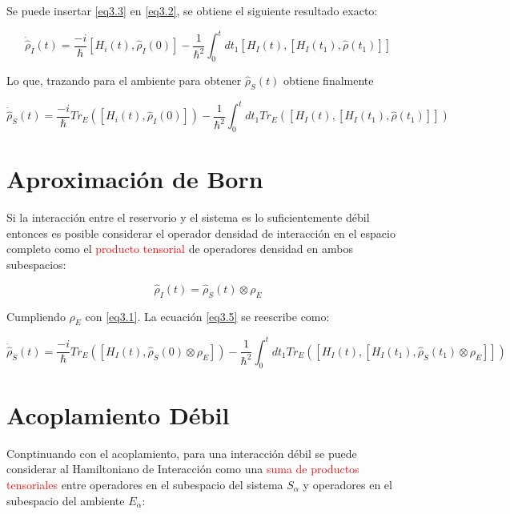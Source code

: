 \documentclass{book}
\begin{document}
Se puede insertar \ref{eq3.3} en \ref{eq3.2}, se obtiene el siguiente resultado exacto:

\begin{equation}\label{eq3.4}\dot{\hat{\rho}}_I(t)=\frac{-i}{\hslash}[H_i(t),\hat{\rho}_I(0)]-\frac{1}{\hslash^2}\int_0^t dt_1 [H_I(t),[H_I(t_1),\hat{\rho}(t_1)]]\end{equation}

Lo que, trazando para el ambiente para obtener $\hat{\rho}_S(t)$ obtiene finalmente

\begin{equation}\label{eq3.5}\dot{\hat{\rho}}_S(t)=\frac{-i}{\hslash}Tr_E([H_i(t),\hat{\rho}_I(0)])-\frac{1}{\hslash^2}\int_0^t dt_1 Tr_E([H_I(t),[H_I(t_1),\hat{\rho}(t_1)]])\end{equation}

\section{Aproximación de Born}

Si la interacción entre el reservorio y el sistema es lo suficientemente débil entonces es posible considerar el operador densidad de interacción en el espacio completo como el \textcolor{red}{producto tensorial} de operadores densidad en ambos subespacios:

\begin{equation}\label{eq3.6}\hat{\rho}_I(t)=\hat{\rho}_S(t)\otimes\rho_E\end{equation}

Cumpliendo $\rho_E$ con \ref{eq3.1}. La ecuación \ref{eq3.5} se reescribe como:

\begin{equation}\label{eq3.7}\dot{\hat{\rho}}_S(t)=\frac{-i}{\hslash}Tr_E([H_I(t),\hat{\rho}_S(0)\otimes\rho_E])-\frac{1}{\hslash^2}\int_0^t dt_1 Tr_E([H_I(t),[H_I(t_1),\hat{\rho}_S(t_1)\otimes\rho_E]])\end{equation}

\section{Acoplamiento Débil}

Conptinuando con el acoplamiento, para una interacción débil se puede considerar al Hamiltoniano de Interacción como una \textcolor{red}{suma de productos tensoriales} entre operadores en el subespacio del sistema $S_\alpha$ y operadores en el subespacio del ambiente $E_\alpha$:
\end{document}
